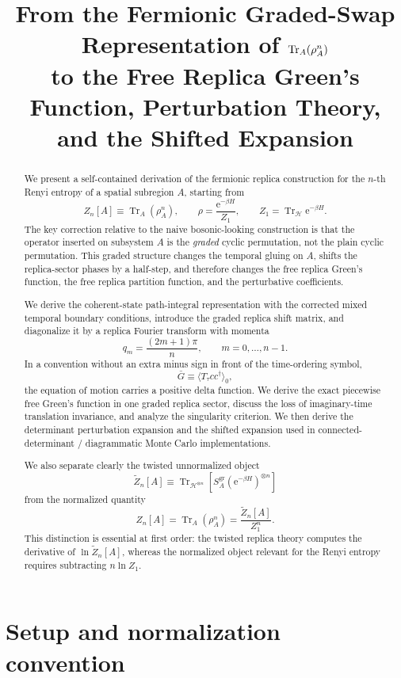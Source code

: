 \documentclass[11pt]{article}
\title{From the Fermionic Graded-Swap Representation of $\Tr_A(\rho_A^n)$\\
to the Free Replica Green's Function, Perturbation Theory,\\
and the Shifted Expansion}
\author{}
\date{}
\newcommand{\Tr}{\operatorname{Tr}}
\newcommand{\e}{\mathrm{e}}
\newcommand{\1}{\mathds{1}}
\newcommand{\HH}{\mathcal{H}}
\newcommand{\br}[1]{\left(#1\right)}
\newcommand{\sq}[1]{\left[#1\right]}
\begin{document}
\maketitle

\begin{abstract}
We present a self-contained derivation of the fermionic replica construction
for the $n$-th Renyi entropy of a spatial subregion $A$, starting from
\[
Z_n[A]\equiv \Tr_A(\rho_A^n),
\qquad
\rho=\frac{\e^{-\beta H}}{Z_1},
\qquad
Z_1=\Tr_{\HH}\e^{-\beta H}.
\]
The key correction relative to the naive bosonic-looking construction is that
the operator inserted on subsystem $A$ is the \emph{graded} cyclic
permutation, not the plain cyclic permutation. This graded structure changes
the temporal gluing on $A$, shifts the replica-sector phases by a half-step,
and therefore changes the free replica Green's function, the free replica
partition function, and the perturbative coefficients.

We derive the coherent-state path-integral representation with the corrected
mixed temporal boundary conditions, introduce the graded replica shift matrix,
and diagonalize it by a replica Fourier transform with momenta
\[
q_m=\frac{(2m+1)\pi}{n}, \qquad m=0,\dots,n-1.
\]
In a convention without an extra minus sign in front of the time-ordering
symbol,
\[
\bar G \equiv \langle T_\tau c c^\dagger\rangle_0,
\]
the equation of motion carries a positive delta function. We derive the exact
piecewise free Green's function in one graded replica sector, discuss the loss
of imaginary-time translation invariance, and analyze the singularity
criterion. We then derive the determinant perturbation expansion and the
shifted expansion used in connected-determinant / diagrammatic Monte Carlo
implementations.

We also separate clearly the twisted unnormalized object
\[
\widetilde Z_n[A]
\equiv
\Tr_{\HH^{\otimes n}}\sq{S_A^{\mathrm{gr}}\br{\e^{-\beta H}}^{\otimes n}}
\]
from the normalized quantity
\[
Z_n[A]=\Tr_A(\rho_A^n)=\frac{\widetilde Z_n[A]}{Z_1^n}.
\]
This distinction is essential at first order: the twisted replica theory
computes the derivative of $\ln \widetilde Z_n[A]$, whereas the normalized
object relevant for the Renyi entropy requires subtracting $n \ln Z_1$.
\end{abstract}

\tableofcontents

\section{Setup and normalization convention}
\end{document}
